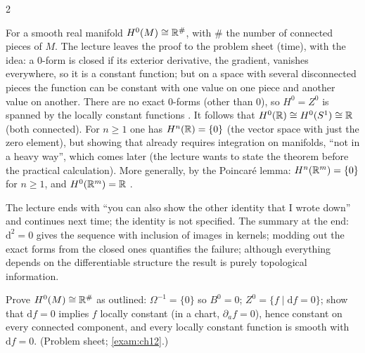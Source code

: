 \begin{paracol}{2}
\begin{example}\label{ex:gr-h0}
For a smooth real manifold $H^0(M)\cong\mathbb{R}^{\#}$, with $\#$ the number of connected pieces of $M$. The lecture leaves the proof to the problem sheet (time), with the idea: a $0$-form is closed if its exterior derivative, the gradient, vanishes everywhere, so it is a constant function; but on a space with several disconnected pieces the function can be constant with one value on one piece and
another value on another. There are no exact $0$-forms (other than $0$), so $H^0=Z^0$ is spanned by the locally constant functions      .
It follows that $H^0(\mathbb{R})\cong H^0(S^1)\cong\mathbb{R}$ (both connected). For $n\ge1$ one has $H^n(\mathbb{R})=\{0\}$ (the vector space with just the zero element), but showing that already requires integration on manifolds, ``not in a heavy way'', which comes later (the lecture wants to state the theorem before the practical calculation). More generally, by the Poincar\'e lemma: $H^n(\mathbb{R}^m)=\{0\}$ for $n\ge1$, and $H^0(\mathbb{R}^m)=\mathbb{R}$
   .
\end{example}
\begin{coursenote}
The lecture ends with ``you can also show the other identity that I wrote down'' and continues next time; the identity is not specified. The summary at the end: $\mathrm d^2=0$ gives the sequence with inclusion of images in kernels; modding out the exact forms from the closed ones quantifies the failure; although everything depends on the differentiable structure the result is purely topological information.  
\end{coursenote}

\begin{exercise}\label{ex:gr-h0-ex}
Prove $H^0(M)\cong\mathbb{R}^{\#}$ as outlined: $\Omega^{-1}=\{0\}$ so $B^0=0$; $Z^0=\{f\mid\mathrm df=0\}$; show that $\mathrm df=0$ implies $f$ locally constant (in a chart, $\partial_af=0$), hence constant on every connected component, and every locally constant function is smooth with $\mathrm df=0$. (Problem sheet; \cref{exam:ch12}.)
\end{exercise}


\end{paracol}
